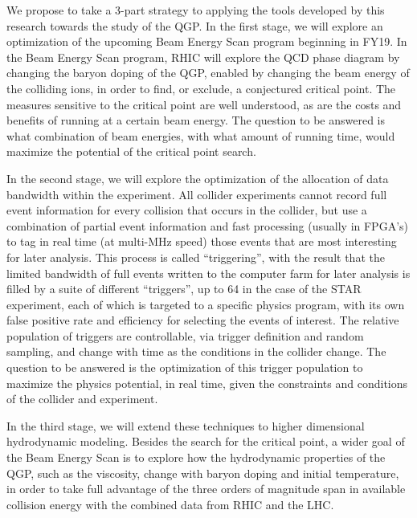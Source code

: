 \documentclass[11pt]{article}
\begin{document}
We propose to take a 3-part strategy to applying the tools developed
by this research towards the study of the QGP.  In the first stage, we
will explore an optimization of the upcoming Beam Energy Scan program
beginning in FY19.  In the Beam Energy Scan program, RHIC will explore
the QCD phase diagram by changing the baryon doping of the QGP,
enabled by changing the beam energy of the colliding ions, in order to
find, or exclude, a conjectured critical point.  The measures
sensitive to the critical point are well understood, as are the costs
and benefits of running at a certain beam energy.  The question to be
answered is what combination of beam energies, with what amount of
running time, would maximize the potential of the critical point
search.

In the second stage, we will explore the optimization of the
allocation of data bandwidth within the experiment.  All collider
experiments cannot record full event information for every collision
that occurs in the collider, but use a combination of partial event
information and fast processing (usually in FPGA's) to tag in real
time (at multi-MHz speed) those events that are most interesting for
later analysis.  This process is called ``triggering'', with the
result that the limited bandwidth of full events written to the
computer farm for later analysis is filled by a suite of different
``triggers'', up to 64 in the case of the STAR experiment, each of
which is targeted to a specific physics program, with its own false
positive rate and efficiency for selecting the events of interest.
The relative population of triggers are controllable, via trigger
definition and random sampling, and change with time as the conditions
in the collider change.  The question to be answered is the
optimization of this trigger population to maximize the physics
potential, in real time, given the constraints and conditions of the
collider and experiment.

In the third stage, we will extend these techniques to higher
dimensional hydrodynamic modeling.  Besides the search for the
critical point, a wider goal of the Beam Energy Scan is to explore how
the hydrodynamic properties of the QGP, such as the viscosity, change
with baryon doping and initial temperature, in order to take full
advantage of the three orders of magnitude span in available collision
energy with the combined data from RHIC and the LHC.
\end{document}
